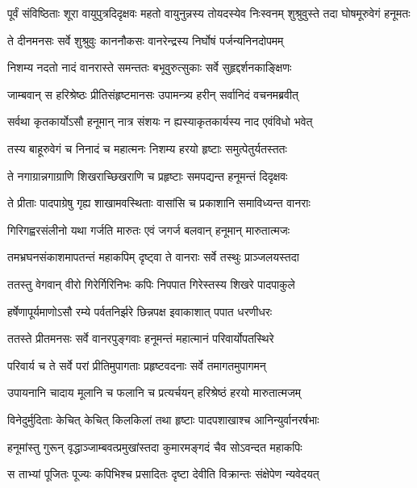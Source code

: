 \threelineshloka
{पूर्वं संविष्ठिताः शूरा वायुपुत्रदिदृक्षवः}
{महतो वायुनुन्नस्य तोयदस्येव निःस्वनम्}
{शुश्रुवुस्ते तदा घोषमूरुवेगं हनूमतः} %

\twolineshloka
{ते दीनमनसः सर्वे शुश्रुवुः काननौकसः}
{वानरेन्द्रस्य निर्घोषं पर्जन्यनिनदोपमम्} %

\twolineshloka
{निशम्य नदतो नादं वानरास्ते समन्ततः}
{बभूवुरुत्सुकाः सर्वे सुहृद्दर्शनकाङ्क्षिणः} %

\twolineshloka
{जाम्बवान् स हरिश्रेष्ठः प्रीतिसंहृष्टमानसः}
{उपामन्त्र्य हरीन् सर्वानिदं वचनमब्रवीत्} %

\twolineshloka
{सर्वथा कृतकार्योऽसौ हनूमान् नात्र संशयः}
{न ह्यस्याकृतकार्यस्य नाद एवंविधो भवेत्} %

\twolineshloka
{तस्य बाहूरुवेगं च निनादं च महात्मनः}
{निशम्य हरयो हृष्टाः समुत्पेतुर्यतस्ततः} %

\twolineshloka
{ते नगाग्रान्नगाग्राणि शिखराच्छिखराणि च}
{प्रहृष्टाः समपद्यन्त हनूमन्तं दिदृक्षवः} %

\twolineshloka
{ते प्रीताः पादपाग्रेषु गृह्य शाखामवस्थिताः}
{वासांसि च प्रकाशानि समाविध्यन्त वानराः} %

\twolineshloka
{गिरिगह्वरसंलीनो यथा गर्जति मारुतः}
{एवं जगर्ज बलवान् हनूमान् मारुतात्मजः} %

\twolineshloka
{तमभ्रघनसंकाशमापतन्तं महाकपिम्}
{दृष्ट्वा ते वानराः सर्वे तस्थुः प्राञ्जलयस्तदा} %

\twolineshloka
{ततस्तु वेगवान् वीरो गिरेर्गिरिनिभः कपिः}
{निपपात गिरेस्तस्य शिखरे पादपाकुले} %

\twolineshloka
{हर्षेणापूर्यमाणोऽसौ रम्ये पर्वतनिर्झरे}
{छिन्नपक्ष इवाकाशात् पपात धरणीधरः} %

\twolineshloka
{ततस्ते प्रीतमनसः सर्वे वानरपुङ्गवाः}
{हनूमन्तं महात्मानं परिवार्योपतस्थिरे} %

\twolineshloka
{परिवार्य च ते सर्वे परां प्रीतिमुपागताः}
{प्रहृष्टवदनाः सर्वे तमागतमुपागमन्} %

\twolineshloka
{उपायनानि चादाय मूलानि च फलानि च}
{प्रत्यर्चयन् हरिश्रेष्ठं हरयो मारुतात्मजम्} %

\twolineshloka
{विनेदुर्मुदिताः केचित् केचित् किलकिलां तथा}
{हृष्टाः पादपशाखाश्च आनिन्युर्वानरर्षभाः} %

\twolineshloka
{हनूमांस्तु गुरून् वृद्धाञ्जाम्बवत्प्रमुखांस्तदा}
{कुमारमङ्गदं चैव सोऽवन्दत महाकपिः} %

\twolineshloka
{स ताभ्यां पूजितः पूज्यः कपिभिश्च प्रसादितः}
{दृष्टा देवीति विक्रान्तः संक्षेपेण न्यवेदयत्} %

